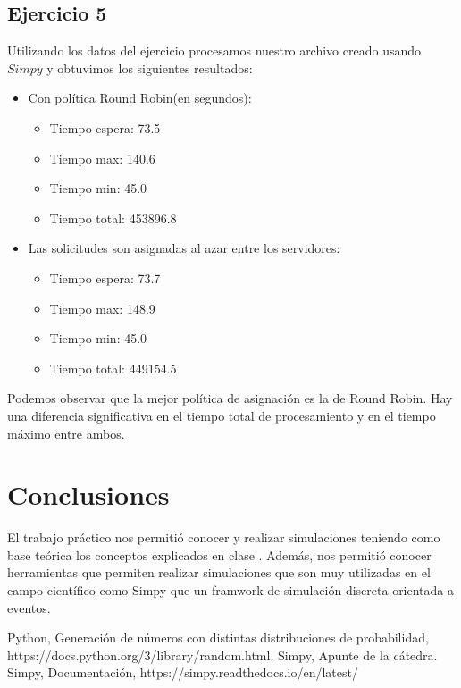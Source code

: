 \documentclass[11pt,a4paper]{article}
\begin{document}
	\subsection{Ejercicio 5}
		Utilizando los datos del ejercicio procesamos nuestro archivo creado usando $Simpy$ y obtuvimos los siguientes resultados:
		\begin{itemize}
			\item Con política Round Robin(en segundos):
				\begin{itemize}
					\item Tiempo espera: 73.5
					\item Tiempo max: 140.6
					\item Tiempo min: 45.0
					\item Tiempo total: 453896.8
				\end{itemize}
			\item Las solicitudes son asignadas al azar entre los servidores:
				\begin{itemize}
					\item Tiempo espera: 73.7
					\item Tiempo max: 148.9
					\item Tiempo min: 45.0
					\item Tiempo total: 449154.5
				\end{itemize}
		\end{itemize}

		Podemos observar que la mejor política de asignación es la de Round Robin. Hay una diferencia significativa en el tiempo total de procesamiento y en el tiempo máximo entre ambos.

\section{Conclusiones}
El trabajo práctico nos permitió conocer y realizar simulaciones teniendo como base teórica los conceptos explicados en clase . Además, nos permitió conocer herramientas que permiten realizar simulaciones que son muy utilizadas en el campo científico como Simpy que un framwork de simulación discreta orientada a eventos.

\begin{thebibliography}{10}
	\bibitem{} Python, Generación de números con distintas distribuciones de probabilidad, https://docs.python.org/3/library/random.html.
	\bibitem{} Simpy, Apunte de la cátedra.
	\bibitem{} Simpy, Documentación, https://simpy.readthedocs.io/en/latest/
	

\end{thebibliography}
\end{document}
